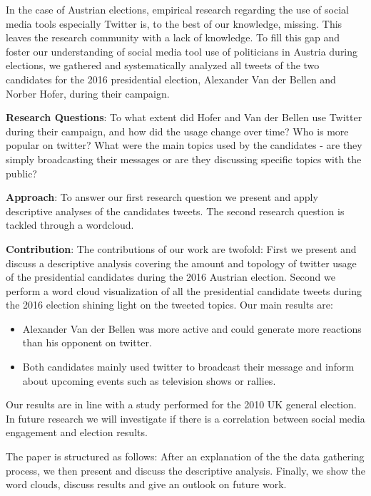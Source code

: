 \documentclass{llncs}
\begin{document}
In the case of Austrian elections, empirical research regarding the use of social media tools especially Twitter is, to the best of our knowledge, missing. This leaves the research community with a lack of knowledge. To fill this gap and foster our understanding of social media tool use of politicians in Austria during elections, we gathered and systematically analyzed all tweets of the two candidates for the 2016 presidential election, Alexander Van der Bellen and Norber Hofer, during their campaign. 

\textbf{Research Questions}: To what extent did Hofer and Van der Bellen use Twitter during their campaign, and how did the usage change over time? Who is more popular on twitter? What were the main topics used by the candidates - are they simply broadcasting their messages or are they discussing specific topics with the public?

\textbf{Approach}: To answer our first research question we present and apply descriptive analyses of the candidates tweets. The second research question is tackled through a wordcloud. 

\textbf{Contribution}: The contributions of our work are twofold: First we present and discuss a descriptive analysis covering the amount and topology of twitter usage of the presidential candidates during the 2016 Austrian election. Second we perform a word cloud visualization of all the presidential candidate tweets during the 2016 election shining light on the tweeted topics.
Our main results are: 
\begin{itemize} 
	\item Alexander Van der Bellen was more active and could generate more reactions than his opponent on twitter.
	\item Both candidates mainly used twitter to broadcast their message and inform about upcoming events such as television shows or rallies.  
\end{itemize}

Our results are in line with a study performed for the 2010 UK general election\cite{graham2013between}. In future research we will investigate if there is a correlation between social media engagement and election results.

The paper is structured as follows: After an explanation of the the data gathering process, we then present and discuss the descriptive analysis. Finally, we show the word clouds, discuss results and give an outlook on future work.
\end{document}
